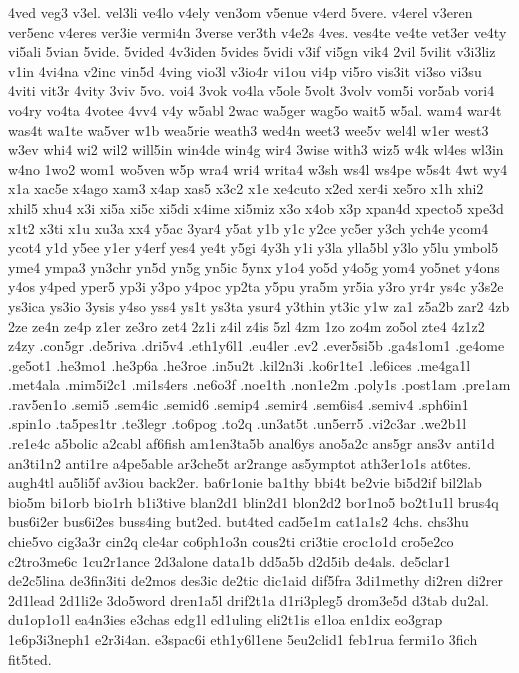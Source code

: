 {4ved
veg3
v3el.
vel3li
ve4lo
v4ely
ven3om
v5enue
v4erd
5vere.
v4erel
v3eren
ver5enc
v4eres
ver3ie
vermi4n
3verse
ver3th
v4e2s
4ves.
ves4te
ve4te
vet3er
ve4ty
vi5ali
5vian
5vide.
5vided
4v3iden
5vides
5vidi
v3if
vi5gn
vik4
2vil
5vilit
v3i3liz
v1in
4vi4na
v2inc
vin5d
4ving
vio3l
v3io4r
vi1ou
vi4p
vi5ro
vis3it
vi3so
vi3su
4viti
vit3r
4vity
3viv
5vo.
voi4
3vok
vo4la
v5ole
5volt
3volv
vom5i
vor5ab
vori4
vo4ry
vo4ta
4votee
4vv4
v4y
w5abl
2wac
wa5ger
wag5o
wait5
w5al.
wam4
war4t
was4t
wa1te
wa5ver
w1b
wea5rie
weath3
wed4n
weet3
wee5v
wel4l
w1er
west3
w3ev
whi4
wi2
wil2
will5in
win4de
win4g
wir4
3wise
with3
wiz5
w4k
wl4es
wl3in
w4no
1wo2
wom1
wo5ven
w5p
wra4
wri4
writa4
w3sh
ws4l
ws4pe
w5s4t
4wt
wy4
x1a
xac5e
x4ago
xam3
x4ap
xas5
x3c2
x1e
xe4cuto
x2ed
xer4i
xe5ro
x1h
xhi2
xhil5
xhu4
x3i
xi5a
xi5c
xi5di
x4ime
xi5miz
x3o
x4ob
x3p
xpan4d
xpecto5
xpe3d
x1t2
x3ti
x1u
xu3a
xx4
y5ac
3yar4
y5at
y1b
y1c
y2ce
yc5er
y3ch
ych4e
ycom4
ycot4
y1d
y5ee
y1er
y4erf
yes4
ye4t
y5gi
4y3h
y1i
y3la
ylla5bl
y3lo
y5lu
ymbol5
yme4
ympa3
yn3chr
yn5d
yn5g
yn5ic
5ynx
y1o4
yo5d
y4o5g
yom4
yo5net
y4ons
y4os
y4ped
yper5
yp3i
y3po
y4poc
yp2ta
y5pu
yra5m
yr5ia
y3ro
yr4r
ys4c
y3s2e
ys3ica
ys3io
3ysis
y4so
yss4
ys1t
ys3ta
ysur4
y3thin
yt3ic
y1w
za1
z5a2b
zar2
4zb
2ze
ze4n
ze4p
z1er
ze3ro
zet4
2z1i
z4il
z4is
5zl
4zm
1zo
zo4m
zo5ol
zte4
4z1z2
z4zy
.con5gr
.de5riva
.dri5v4
.eth1y6l1
.eu4ler
.ev2
.ever5si5b
.ga4s1om1
.ge4ome
.ge5ot1
.he3mo1
.he3p6a
.he3roe
.in5u2t
.kil2n3i
.ko6r1te1
.le6ices
.me4ga1l
.met4ala
.mim5i2c1
.mi1s4ers
.ne6o3f
.noe1th
.non1e2m
.poly1s
.post1am
.pre1am
.rav5en1o
.semi5
.sem4ic
.semid6
.semip4
.semir4
.sem6is4
.semiv4
.sph6in1
.spin1o
.ta5pes1tr
.te3legr
.to6pog
.to2q
.un3at5t
.un5err5
.vi2c3ar
.we2b1l
.re1e4c
a5bolic
a2cabl
af6fish
am1en3ta5b
anal6ys
ano5a2c
ans5gr
ans3v
anti1d
an3ti1n2
anti1re
a4pe5able
ar3che5t
ar2range
as5ymptot
ath3er1o1s
at6tes.
augh4tl
au5li5f
av3iou
back2er.
ba6r1onie
ba1thy
bbi4t
be2vie
bi5d2if
bil2lab
bio5m
bi1orb
bio1rh
b1i3tive
blan2d1
blin2d1
blon2d2
bor1no5
bo2t1u1l
brus4q
bus6i2er
bus6i2es
buss4ing
but2ed.
but4ted
cad5e1m
cat1a1s2
4chs.
chs3hu
chie5vo
cig3a3r
cin2q
cle4ar
co6ph1o3n
cous2ti
cri3tie
croc1o1d
cro5e2co
c2tro3me6c
1cu2r1ance
2d3alone
data1b
dd5a5b
d2d5ib
de4als.
de5clar1
de2c5lina
de3fin3iti
de2mos
des3ic
de2tic
dic1aid
dif5fra
3di1methy
di2ren
di2rer
2d1lead
2d1li2e
3do5word
dren1a5l
drif2t1a
d1ri3pleg5
drom3e5d
d3tab
du2al.
du1op1o1l
ea4n3ies
e3chas
edg1l
ed1uling
eli2t1is
e1loa
en1dix
eo3grap
1e6p3i3neph1
e2r3i4an.
e3spac6i
eth1y6l1ene
5eu2clid1
feb1rua
fermi1o
3fich
fit5ted.
}
